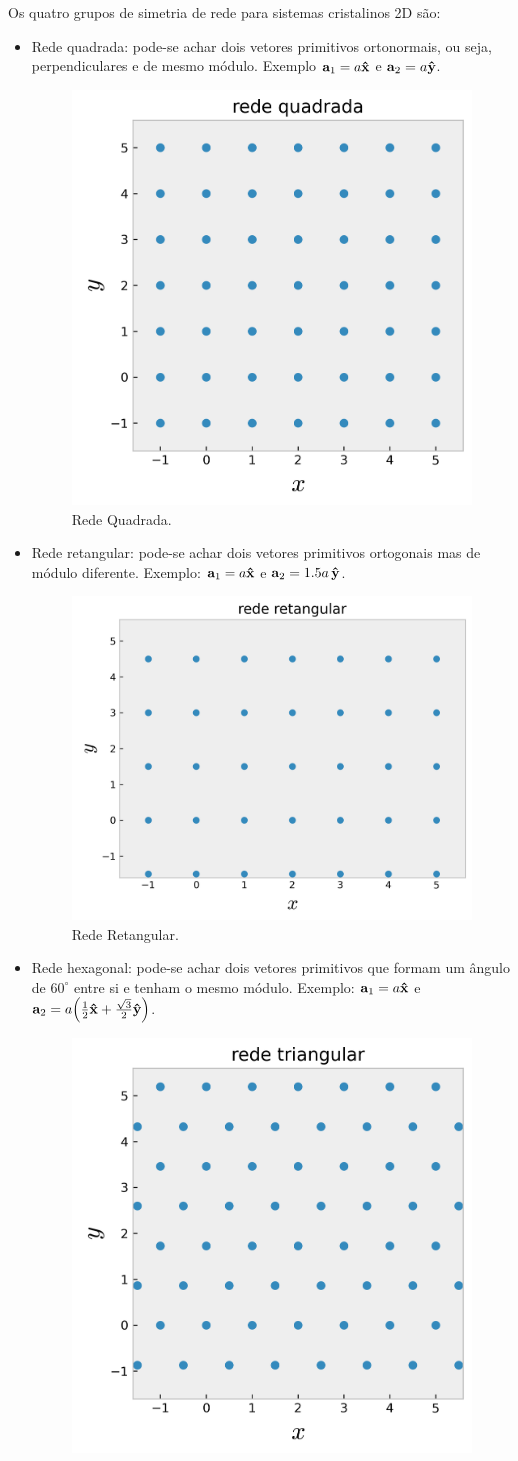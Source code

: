 \documentclass[a4paper,10pt]{article}
\begin{document}
Os quatro grupos de simetria de rede para sistemas cristalinos 2D são:
\begin{itemize}
\item Rede quadrada: pode-se achar dois vetores primitivos ortonormais, ou seja, perpendiculares e de mesmo módulo. Exemplo $\vb{a}_1 = a \vu{x}$ e $\vb{a}_2 = a \vu{y}$.
\begin{figure}[H]
\centering
\includegraphics[width=0.35\linewidth]{fig/lattice_quad.png}
\caption{Rede Quadrada.}
\label{fig:lat-quad}
\end{figure}
\item Rede retangular: pode-se achar dois vetores primitivos ortogonais mas de módulo diferente. Exemplo: $\vb{a}_1 = a \vu{x}$ e $\vb{a}_2 = 1.5 a \,\vu{y}$.
\begin{figure}[H]
\centering
\includegraphics[width=0.35\linewidth]{fig/lattice_retang.png}
\caption{Rede Retangular.}
\label{fig:lat-retang}
\end{figure}
\item Rede hexagonal: pode-se achar dois vetores primitivos que formam um ângulo de $60^\circ$ entre si e tenham o mesmo módulo. Exemplo: $\vb{a}_1 = a \vu{x}$ e $\vb{a}_2 = a \qty(\frac{1}{2} \vu{x} + \frac{\sqrt{3}}{2} \vu{y})$.
\begin{figure}[H]
\centering
\includegraphics[width=0.35\linewidth]{fig/lattice_triang.png}

\end{figure}
\end{itemize}
\end{document}
